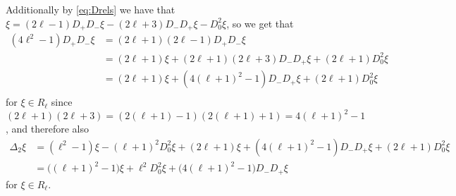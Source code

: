 Additionally by \cref{eq:Drels} we have that $\xi= (2\ell-1)D_+D_- \xi - (2\ell+3)D_-D_+\xi - D_0^2\xi$, so we get that
\begin{align*}
  (4\ell^2-1)D_+D_-\xi &= (2\ell+1)(2\ell-1)D_+D_-\xi \\
                       &= (2\ell+1)\xi + (2\ell+1)(2\ell+3)D_-D_+\xi + (2\ell+1)D_0^2\xi \\
                       &= (2\ell+1)\xi + (4(\ell+1)^2-1)D_-D_+\xi + (2\ell+1)D_0^2\xi \\
\end{align*}
for $\xi\in R_\ell$ since $(2\ell+1)(2\ell+3)=(2(\ell+1)-1)(2(\ell+1)+1)=4(\ell+1)^2-1$, and therefore also
\begin{align*}
  \Delta_2 \xi &= (\ell^2-1)\xi - (\ell+1)^2D_0^2 \xi + (2\ell+1)\xi + (4(\ell+1)^2-1)D_-D_+\xi + (2\ell+1)D_0^2\xi \\
  &= \bigl((\ell+1)^2-1\bigr)\xi  + \ell^2D_0^2\xi + \bigl(4(\ell+1)^2-1\bigr)D_-D_+\xi
\end{align*}
for $\xi\in R_\ell$. 

